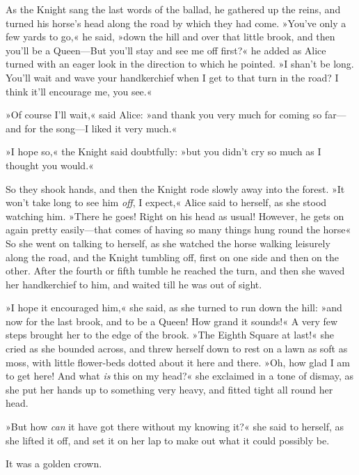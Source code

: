 As the Knight sang the last words of the ballad, he gathered up the reins, and turned his horse's head along the road by which they had come. »You've only a few yards to go,« he said, »down the hill and over that little brook, and then you'll be a Queen—But you'll stay and see me off first?« he added as Alice turned with an eager look in the direction to which he pointed. »I shan't be long. You'll wait and wave your handkerchief when I get to that turn in the road? I think it'll encourage me, you see.«

»Of course I'll wait,« said Alice: »and thank you very much for coming so far—and for the song—I liked it very much.«

»I hope so,« the Knight said doubtfully: »but you didn't cry so much as I thought you would.«

So they shook hands, and then the Knight rode slowly away into the forest. »It won't take long to see him \textit{off}, I expect,« Alice said to herself, as she stood watching him. »There he goes! Right on his head as usual! However, he gets on again pretty easily—that comes of having so many things hung round the horse\longdash« So she went on talking to herself, as she watched the horse walking leisurely along the road, and the Knight tumbling off, first on one side and then on the other. After the fourth or fifth tumble he reached the turn, and then she waved her handkerchief to him, and waited till he was out of sight.

»I hope it encouraged him,« she said, as she turned to run down the hill: »and now for the last brook, and to be a Queen! How grand it sounds!« A very few steps brought her to the edge of the brook. »The Eighth Square at last!« she cried as she bounded across, and threw herself down to rest on a lawn as soft as moss, with little flower-beds dotted about it here and there. »Oh, how glad I am to get here! And what \textit{is} this on my head?« she exclaimed in a tone of dismay, as she put her hands up to something very heavy, and fitted tight all round her head.

»But how \textit{can} it have got there without my knowing it?« she said to herself, as she lifted it off, and set it on her lap to make out what it could possibly be.

It was a golden crown.
\label{white8}
\label{black7}


